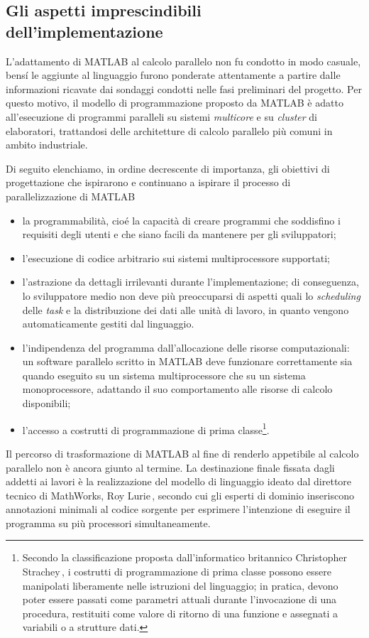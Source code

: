 \subsection{Gli aspetti imprescindibili dell'implementazione}
\label{sec2.1.2}
L'adattamento di MATLAB al calcolo parallelo non fu condotto in modo casuale, bens\'i le aggiunte al linguaggio furono ponderate attentamente a partire dalle informazioni ricavate dai sondaggi condotti nelle fasi preliminari del progetto.\newline
Per questo motivo, il modello di programmazione proposto da MATLAB \`e adatto all'esecuzione di programmi paralleli su sistemi \textit{multicore} e su \textit{cluster} di elaboratori, trattandosi delle architetture di calcolo parallelo pi\`u comuni in ambito industriale.

Di seguito elenchiamo, in ordine decrescente di importanza, gli obiettivi di progettazione che ispirarono e continuano a ispirare il processo di parallelizzazione di MATLAB
\begin{itemize}
    \item la programmabilit\`a, cio\'e la capacit\`a di creare programmi che soddisfino i requisiti degli utenti e che siano facili da mantenere per gli sviluppatori;
    \item l'esecuzione di codice arbitrario sui sistemi multiprocessore supportati;
    \item l'astrazione da dettagli irrilevanti durante l'implementazione; di conseguenza, lo sviluppatore medio non deve pi\`u preoccuparsi di aspetti quali lo \textit{scheduling} delle \textit{task} e la distribuzione dei dati alle unit\`a di lavoro, in quanto vengono automaticamente gestiti dal linguaggio.
    \item l'indipendenza del programma dall'allocazione delle risorse computazionali: un software parallelo scritto in MATLAB deve funzionare correttamente sia quando eseguito su un sistema multiprocessore che su un sistema monoprocessore, adattando il suo comportamento alle risorse di calcolo disponibili;
    \item l'accesso a costrutti di programmazione di prima classe\footnote{Secondo la classificazione proposta dall'informatico britannico Christopher Strachey\,\cite{Abelson2002}, i costrutti di programmazione di prima classe possono essere manipolati liberamente nelle istruzioni del linguaggio; in pratica, devono poter essere passati come parametri attuali durante l'invocazione di una procedura, restituiti come valore di ritorno di una funzione e assegnati a variabili o a strutture dati.}.
\end{itemize}
Il percorso di trasformazione di MATLAB al fine di renderlo appetibile al calcolo parallelo non \`e ancora giunto al termine. \newline La destinazione finale fissata
dagli addetti ai lavori \`e la realizzazione del modello di linguaggio ideato dal direttore tecnico di MathWorks, Roy Lurie\,\cite{Hemsoth2008},
secondo cui gli esperti di dominio inseriscono annotazioni minimali al codice sorgente per esprimere l'intenzione di eseguire il programma
su pi\`u processori simultaneamente.
